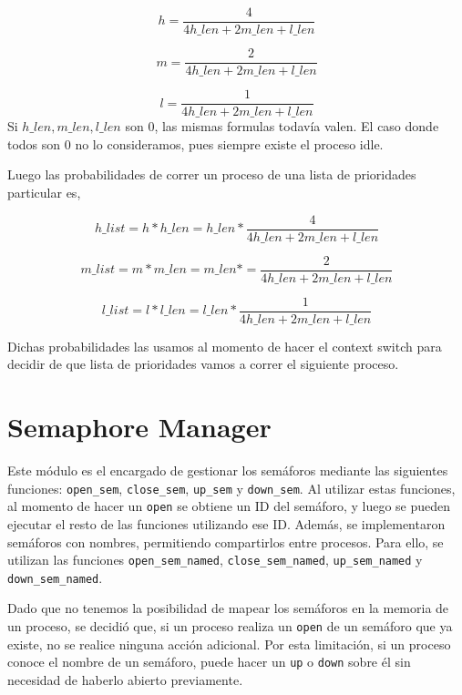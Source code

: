 \documentclass{article}
\begin{document}
\begin{equation*}
h = \frac{4}{4 h\_len + 2 m\_len + l\_len}
\end{equation*}

\begin{equation*}
m = \frac{2}{4 h\_len + 2 m\_len + l\_len}
\end{equation*}

\begin{equation*}
l = \frac{1}{4 h\_len + 2 m\_len + l\_len}
\end{equation*}
Si $h\_len, m\_len, l\_len$ son 0, las mismas formulas todavía valen. El caso donde todos son 0 no lo consideramos, pues siempre existe el proceso idle.

Luego las probabilidades de correr un proceso de una lista de prioridades particular es,

\begin{equation*}
h\_list = h * h\_len = h\_len *  \frac{4}{4 h\_len + 2 m\_len + l\_len}
\end{equation*}

\begin{equation*}
m\_list = m * m\_len = m\_len * = \frac{2}{4 h\_len + 2 m\_len + l\_len}
\end{equation*}

\begin{equation*}
l\_list = l * l\_len = l\_len * \frac{1}{4 h\_len + 2 m\_len + l\_len}
\end{equation*}

Dichas probabilidades las usamos al momento de hacer el context switch para decidir de que lista de prioridades vamos a correr el siguiente proceso.

\section{Semaphore Manager}

Este módulo es el encargado de gestionar los semáforos mediante las siguientes funciones: \texttt{open\_sem}, \texttt{close\_sem}, \texttt{up\_sem} y \texttt{down\_sem}. Al utilizar estas funciones, al momento de hacer un \texttt{open} se obtiene un ID del semáforo, y luego se pueden ejecutar el resto de las funciones utilizando ese ID. Además, se implementaron semáforos con nombres, permitiendo compartirlos entre procesos. Para ello, se utilizan las funciones \texttt{open\_sem\_named}, \texttt{close\_sem\_named}, \texttt{up\_sem\_named} y \texttt{down\_sem\_named}.

Dado que no tenemos la posibilidad de mapear los semáforos en la memoria de un proceso, se decidió que, si un proceso realiza un \texttt{open} de un semáforo que ya existe, no se realice ninguna acción adicional. Por esta limitación, si un proceso conoce el nombre de un semáforo, puede hacer un \texttt{up} o \texttt{down} sobre él sin necesidad de haberlo abierto previamente.
\end{document}

